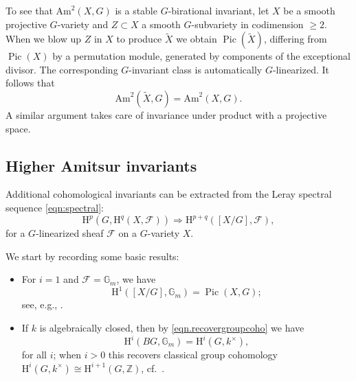 \documentclass[12pt,reqno]{amsart}
\theoremstyle{plain}
\theoremstyle{remark}
\theoremstyle{definition}
\numberwithin{equation}{section}
\newcommand{\cF}{{\mathcal F}}
\newcommand{\rH}{{\mathrm H}}
\newcommand{\bG}{{\mathbb G}}
\newcommand{\bZ}{{\mathbb Z}}
\newcommand{\Am}{\mathrm{Am}}
\DeclareMathOperator{\Pic}{Pic}
\begin{document}
To see that $\Am^2(X,G)$ is a stable $G$-birational invariant, 
let $X$ be a smooth projective $G$-variety and $Z\subset X$ a smooth $G$-subvariety in codimension $\ge 2$.
When we blow up $Z$ in $X$ to produce $\widetilde{X}$ we obtain $\Pic(\widetilde{X})$, differing from $\Pic(X)$ by a permutation module, generated by 
components of the exceptional divisor. The corresponding $G$-invariant class is automatically $G$-linearized. It follows that 
$$
\Am^2(\widetilde{X},G)=\Am^2(X,G). 
$$
A similar argument takes care of invariance under product with a projective space.

\subsection*{Higher Amitsur invariants}
Additional cohomological invariants
can be extracted from the Leray spectral sequence \eqref{eqn:spectral}:
\begin{equation*} 
\rH^p(G,\rH^q(X, \cF)) \Rightarrow \rH^{p+q}([X/G], \cF),
\end{equation*}
for a $G$-linearized sheaf $\cF$ on a $G$-variety $X$. 

We start by recording some basic results:
\begin{itemize} 
\item 
For $i=1$ and $\cF=\bG_m$, we have 
$$
\rH^1([X/G],\bG_m)=\Pic(X,G); 
$$
see, e.g., \cite[Sect.\ 3]{KT-dp}.
\item 
If $k$ is algebraically closed, then by \eqref{eqn.recovergroupcoho} we have
$$
\rH^i(BG, \bG_m)=\rH^i(G,k^\times),
$$
for all $i$; when $i>0$ this recovers
classical group cohomology
$\rH^i(G,k^\times)\cong \rH^{i+1}(G,\bZ)$, cf.\ \cite[\S 2.1]{KT-dp}.
\end{itemize}
\end{document}
